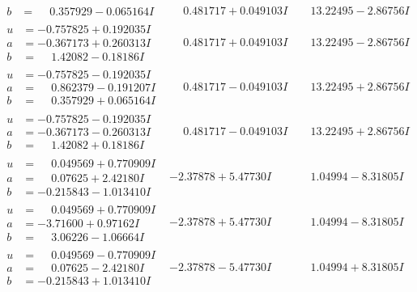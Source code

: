 \documentclass[1p]{elsarticle_modified}
\theoremstyle{definition}
\begin{document}
$$\begin{array}{c|c|c}
\begin{aligned}
b &= \phantom{-}0.357929 - 0.065164 I\end{aligned}
 & \phantom{-}0.481717 + 0.049103 I & \phantom{-}13.22495 - 2.86756 I \\ \hline\begin{aligned}
u &= -0.757825 + 0.192035 I \\
a &= -0.367173 + 0.260313 I \\
b &= \phantom{-}1.42082 - 0.18186 I\end{aligned}
 & \phantom{-}0.481717 + 0.049103 I & \phantom{-}13.22495 - 2.86756 I \\ \hline\begin{aligned}
u &= -0.757825 - 0.192035 I \\
a &= \phantom{-}0.862379 - 0.191207 I \\
b &= \phantom{-}0.357929 + 0.065164 I\end{aligned}
 & \phantom{-}0.481717 - 0.049103 I & \phantom{-}13.22495 + 2.86756 I \\ \hline\begin{aligned}
u &= -0.757825 - 0.192035 I \\
a &= -0.367173 - 0.260313 I \\
b &= \phantom{-}1.42082 + 0.18186 I\end{aligned}
 & \phantom{-}0.481717 - 0.049103 I & \phantom{-}13.22495 + 2.86756 I \\ \hline\begin{aligned}
u &= \phantom{-}0.049569 + 0.770909 I \\
a &= \phantom{-}0.07625 + 2.42180 I \\
b &= -0.215843 - 1.013410 I\end{aligned}
 & -2.37878 + 5.47730 I & \phantom{-}1.04994 - 8.31805 I \\ \hline\begin{aligned}
u &= \phantom{-}0.049569 + 0.770909 I \\
a &= -3.71600 + 0.97162 I \\
b &= \phantom{-}3.06226 - 1.06664 I\end{aligned}
 & -2.37878 + 5.47730 I & \phantom{-}1.04994 - 8.31805 I \\ \hline\begin{aligned}
u &= \phantom{-}0.049569 - 0.770909 I \\
a &= \phantom{-}0.07625 - 2.42180 I \\
b &= -0.215843 + 1.013410 I\end{aligned}
 & -2.37878 - 5.47730 I & \phantom{-}1.04994 + 8.31805 I \\ \hline\begin{aligned}

\end{aligned}
\end{array}$$
\end{document}
